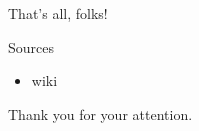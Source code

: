
\begin{frame}{That's all, folks!}
  \begin{block}{Sources}
    \begin{itemize}
      \item wiki
    \end{itemize}
  \end{block}

  \begin{block}{}
    Thank you for your attention. 
  \end{block}
\end{frame}

